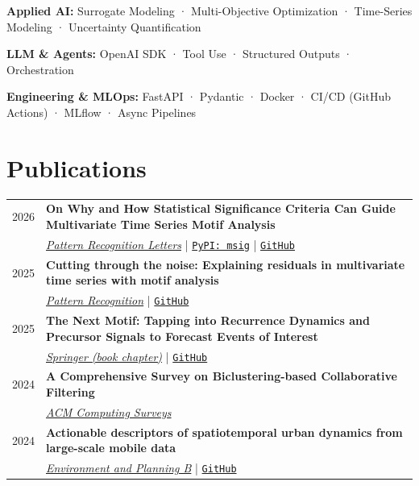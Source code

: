 \documentclass[a4paper,10pt]{article}
\begin{document}
\textbf{Applied AI:} Surrogate Modeling · Multi-Objective Optimization · Time-Series Modeling · Uncertainty Quantification

\textbf{LLM \& Agents:} OpenAI SDK · Tool Use · Structured Outputs · Orchestration

\textbf{Engineering \& MLOps:} FastAPI · Pydantic · Docker · CI/CD (GitHub Actions) · MLflow · Async Pipelines


\section{Publications}

\begin{tabularx}{\linewidth}{r|X}

\textsc{2026} & {\small\textbf{On Why and How Statistical Significance Criteria Can Guide Multivariate Time Series Motif Analysis}} \\
 & \href{https://doi.org/10.1016/j.patrec.2026.04.020}{\textit{Pattern Recognition Letters}} \enspace | \enspace \href{https://pypi.org/project/msig/}{\texttt{PyPI: msig}} \enspace | \enspace \href{https://github.com/MiguelGarcaoSilva/msig}{\texttt{GitHub}} \\[6pt]

\textsc{2025} & {\small\textbf{Cutting through the noise: Explaining residuals in multivariate time series with motif analysis}} \\
 & \href{https://www.sciencedirect.com/science/article/pii/S0031320325005606\#sec5}{\textit{Pattern Recognition}} \enspace | \enspace \href{https://github.com/MiguelGarcaoSilva/motifsinresidual}{\texttt{GitHub}} \\[6pt]

\textsc{2025} & {\small\textbf{The Next Motif: Tapping into Recurrence Dynamics and Precursor Signals to Forecast Events of Interest}} \\
 & \href{https://link.springer.com/chapter/10.1007/978-3-032-15535-1_2}{\textit{Springer (book chapter)}} \enspace | \enspace \href{https://github.com/MiguelGarcaoSilva/motifpred}{\texttt{GitHub}} \\[6pt]

\textsc{2024} & {\small\textbf{A Comprehensive Survey on Biclustering-based Collaborative Filtering}} \\
 & \href{https://doi.org/10.1145/3674723}{\textit{ACM Computing Surveys}} \\[6pt]

\textsc{2024} & {\small\textbf{Actionable descriptors of spatiotemporal urban dynamics from large-scale mobile data}} \\
 & \href{https://journals.sagepub.com/doi/full/10.1177/23998083231219048}{\textit{Environment and Planning B}} \enspace | \enspace \href{https://github.com/MiguelGarcaoSilva/cml_synthetic_demo}{\texttt{GitHub}} \\[6pt]


\end{tabularx}
\end{document}
